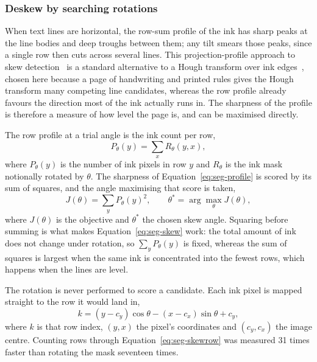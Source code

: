 \subsubsection{Deskew by searching rotations}

When text lines are horizontal, the row-sum profile of the ink has sharp peaks at the line bodies and deep troughs between them; any tilt smears those peaks, since a single row then cuts across several lines. This projection-profile approach to skew detection~\cite{postl1986} is a standard alternative to a Hough transform over ink edges~\cite{duda1972}, chosen here because a page of handwriting and printed rules gives the Hough transform many competing line candidates, whereas the row profile already favours the direction most of the ink actually runs in. The sharpness of the profile is therefore a measure of how level the page is, and can be maximised directly.

The row profile at a trial angle is the ink count per row,
\begin{equation}
P_\theta(y)=\sum_x R_\theta(y,x),
\label{eq:seg-profile}
\end{equation}
where $P_\theta(y)$ is the number of ink pixels in row $y$ and $R_\theta$ is the ink mask notionally rotated by $\theta$. The sharpness of Equation~\ref{eq:seg-profile} is scored by its sum of squares, and the angle maximising that score is taken,
\begin{equation}
J(\theta)=\sum_y P_\theta(y)^2,\qquad \theta^*=\arg\max_\theta J(\theta),
\label{eq:seg-skew}
\end{equation}
where $J(\theta)$ is the objective and $\theta^*$ the chosen skew angle. Squaring before summing is what makes Equation~\ref{eq:seg-skew} work: the total amount of ink does not change under rotation, so $\sum_yP_\theta(y)$ is fixed, whereas the sum of squares is largest when the same ink is concentrated into the fewest rows, which happens when the lines are level.

The rotation is never performed to score a candidate. Each ink pixel is mapped straight to the row it would land in,
\begin{equation}
k=(y-c_y)\cos\theta-(x-c_x)\sin\theta+c_y,
\label{eq:seg-skewrow}
\end{equation}
where $k$ is that row index, $(y,x)$ the pixel's coordinates and $(c_y,c_x)$ the image centre. Counting rows through Equation~\ref{eq:seg-skewrow} was measured 31 times faster than rotating the mask seventeen times.

